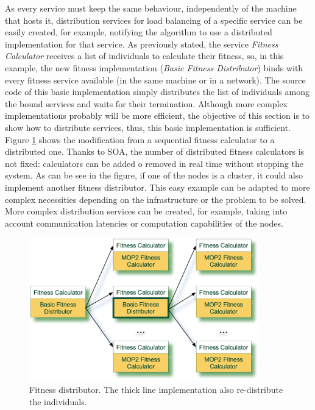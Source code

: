 As every service must keep the same behaviour, independently of the machine that hosts it, distribution services for load balancing of a specific service can be easily created, for example, notifying the algorithm to use a distributed implementation for that service. As previously stated, the service {\em Fitness Calculator} receives a list of individuals to calculate their fitness, so, in this example, the new fitness implementation ({\em Basic Fitness Distributor}) binds with every fitness service available (in the same machine or in a network). The source code of this basic implementation simply distributes the list of individuals among the bound services and waits for their termination. Although more complex implementations probably will be more efficient, the objective of this section is to show how to distribute services, thus, this basic implementation is sufficient. Figure \ref{FITNESSDISTRIBUTOR} shows the modification from a sequential fitness calculator to a distributed one. Thanks to SOA, the number of distributed fitness calculators is not fixed: calculators can be added o removed in real time without stopping the system. As can be see in the figure, if one of the nodes is a cluster, it could also  implement another fitness distributor. This easy example can be adapted to more complex necessities depending on the infrastructure or the problem to be solved. More complex distribution services can be created, for example, taking into account communication latencies or computation capabilities of the nodes.




\begin{figure}
\centering
\includegraphics[width=10cm]{gfx/soaea/distributor.jpg}
\caption{Fitness distributor. The thick line implementation also re-distribute the individuals.}
\label{FITNESSDISTRIBUTOR}
\end{figure}



